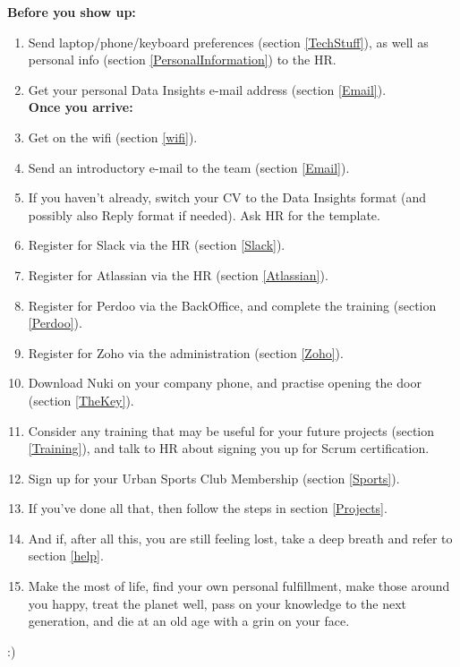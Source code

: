 \documentclass[11pt]{report}
\begin{document}
\noindent \textbf{Before you show up:}
\begin{enumerate}
\item Send laptop/phone/keyboard preferences (section \ref{TechStuff}), as well as personal info (section \ref{PersonalInformation}) to the HR.
\item Get your personal Data Insights e-mail address (section \ref{Email}).\\

\hspace{-0.95cm}\textbf{Once you arrive:}
\item Get on the wifi (section \ref{wifi}).
\item Send an introductory e-mail to the team (section \ref{Email}).
\item If you haven't already, switch your CV to the Data Insights format (and possibly also Reply format if needed). Ask HR for the template.
\item Register for Slack via the HR (section \ref{Slack}).
\item Register for Atlassian via the HR (section \ref{Atlassian}).
\item Register for Perdoo via the BackOffice, and complete the training (section \ref{Perdoo}).
\item Register for Zoho via the administration (section \ref{Zoho}).
\item Download Nuki on your company phone, and practise opening the door (section \ref{TheKey}).
\item Consider any training that may be useful for your future projects (section \ref{Training}), and talk to HR about signing you up for Scrum certification.
\item Sign up for your Urban Sports Club Membership (section \ref{Sports}).
\item If you've done all that, then follow the steps in section \ref{Projects}.
\item And if, after all this, you are still feeling lost, take a deep breath and refer to section \ref{help}.
\item Make the most of life, find your own personal fulfillment, make those around you happy, treat the planet well, pass on your knowledge to the next generation, and die at an old age with a grin on your face.
\end{enumerate}
\vspace{1cm}
\begin{center}
:)
\end{center}
\end{document}
